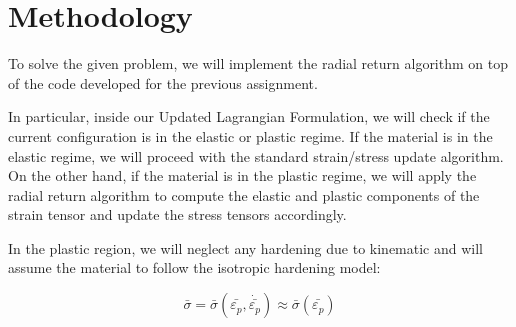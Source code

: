 \section{Methodology}
\label{sec:methodology}

To solve the given problem, we will implement the radial return algorithm on top of the code developed for the previous assignment.

In particular, inside our Updated Lagrangian Formulation, we will check if the current configuration is in the elastic or plastic regime.
If the material is in the elastic regime, we will proceed with the standard strain/stress update algorithm.
On the other hand, if the material is in the plastic regime, we will apply the radial return algorithm to compute the elastic and plastic components of the strain tensor and update the stress tensors accordingly.

In the plastic region, we will neglect any hardening due to kinematic and will assume the material to follow the isotropic hardening model:

\begin{equation}
    \bar{\sigma} = \bar{\sigma}(\bar{\varepsilon_p}, \dot{\bar{\varepsilon_p}}) \approx \bar{\sigma}(\bar{\varepsilon_p})
\end{equation}
